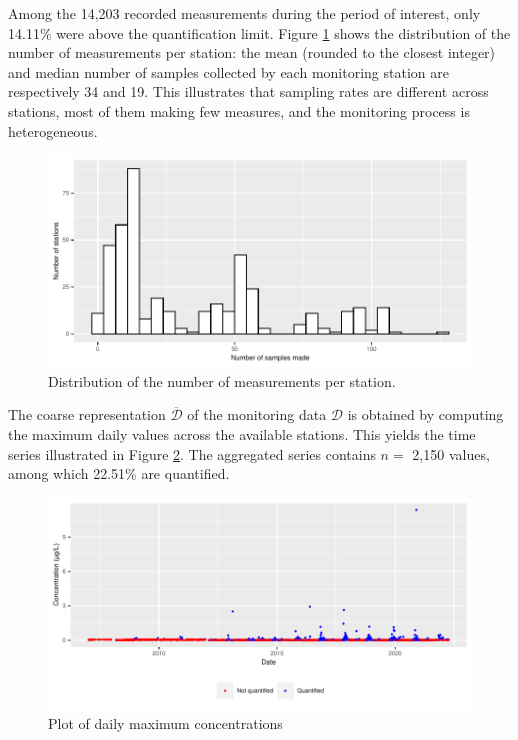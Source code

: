 Among the 14,203 recorded measurements during the period of interest, only 14.11\% were above the quantification limit. Figure \ref{fig:histogram} shows the distribution of the number of measurements per station: the mean (rounded to the closest integer) and median number of samples collected by each monitoring station are respectively 34 and 19. This illustrates that sampling rates are different across stations, most of them making few measures, and the monitoring process is heterogeneous.

\begin{figure}[htbp]
  \centering
  \includegraphics[]{figs/Chap5/hist_samp_sta.pdf}
  \caption{Distribution of the number of measurements per station.}
  \label{fig:histogram}
\end{figure}

The coarse representation $\overline{\mathcal{D}}$ of the monitoring data $\mathcal{D}$ is obtained by computing the maximum daily values across the available stations. This yields the time series illustrated in Figure \ref{time:serie}. The aggregated series contains $n =$ 2,150 values, among which 22.51\% are quantified. 

\begin{figure}[htbp]
  \centering
  \includegraphics[]{figs/Chap5/Max_temp-1.pdf}
  \caption{Plot of daily maximum concentrations}
  \label{time:serie}
\end{figure}


